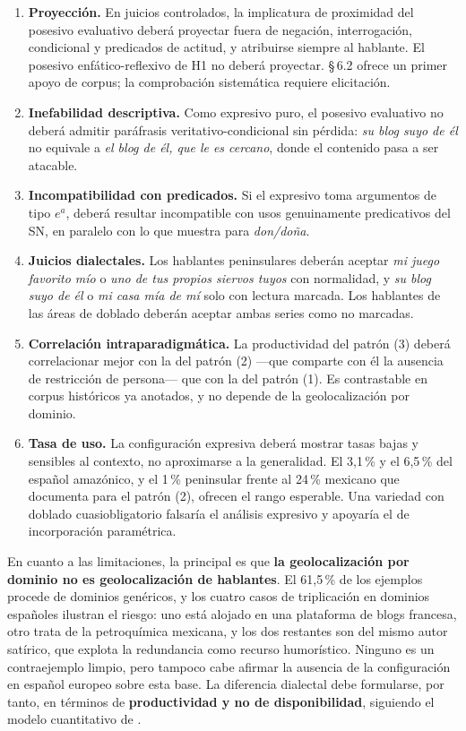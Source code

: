 \documentclass[12pt,a4paper]{article}
\begin{document}
\begin{enumerate}[label=\arabic*.,leftmargin=1.5em]
\item \textbf{Proyección.} En juicios controlados, la implicatura de proximidad del posesivo evaluativo deberá proyectar fuera de negación, interrogación, condicional y predicados de actitud, y atribuirse siempre al hablante. El posesivo enfático-reflexivo de H1 no deberá proyectar. \S\,6.2 ofrece un primer apoyo de corpus; la comprobación sistemática requiere elicitación.
\item \textbf{Inefabilidad descriptiva.} Como expresivo puro, el posesivo evaluativo no deberá admitir paráfrasis veritativo-condicional sin pérdida: \textit{su blog suyo de él} no equivale a \textit{el blog de él, que le es cercano}, donde el contenido pasa a ser atacable.
\item \textbf{Incompatibilidad con predicados.} Si el expresivo toma argumentos de tipo $e^a$, deberá resultar incompatible con usos genuinamente predicativos del SN, en paralelo con lo que \textcite{saab2021} muestra para \textit{don/doña}.
\item \textbf{Juicios dialectales.} Los hablantes peninsulares deberán aceptar \textit{mi juego favorito mío} o \textit{uno de tus propios siervos tuyos} con normalidad, y \textit{su blog suyo de él} o \textit{mi casa mía de mí} solo con lectura marcada. Los hablantes de las áreas de doblado deberán aceptar ambas series como no marcadas.
\item \textbf{Correlación intraparadigmática.} La productividad del patrón (3) deberá correlacionar mejor con la del patrón (2) ---que comparte con él la ausencia de restricción de persona--- que con la del patrón (1). Es contrastable en corpus históricos ya anotados, y no depende de la geolocalización por dominio.
\item \textbf{Tasa de uso.} La configuración expresiva deberá mostrar tasas bajas y sensibles al contexto, no aproximarse a la generalidad. El 3,1\,\% y el 6,5\,\% del español amazónico, y el 1\,\% peninsular frente al 24\,\% mexicano que \textcite{reyesmendoza2000} documenta para el patrón (2), ofrecen el rango esperable. Una variedad con doblado cuasiobligatorio falsaría el análisis expresivo y apoyaría el de incorporación paramétrica.
\end{enumerate}

En cuanto a las limitaciones, la principal es que \textbf{la geolocalización por dominio no es geolocalización de hablantes}. El 61,5\,\% de los ejemplos procede de dominios genéricos, y los cuatro casos de triplicación en dominios españoles ilustran el riesgo: uno está alojado en una plataforma de blogs francesa, otro trata de la petroquímica mexicana, y los dos restantes son del mismo autor satírico, que explota la redundancia como recurso humorístico. Ninguno es un contraejemplo limpio, pero tampoco cabe afirmar la ausencia de la configuración en español europeo sobre esta base. La diferencia dialectal debe formularse, por tanto, en términos de \textbf{productividad y no de disponibilidad}, siguiendo el modelo cuantitativo de \textcite{reyesmendoza2000}.
\end{document}
